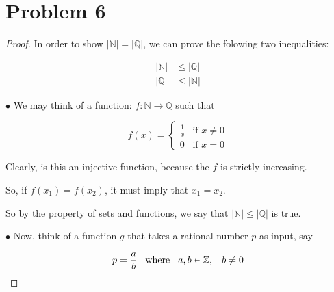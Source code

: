 \documentclass[12pt]{article}
\begin{document}
\newpage
\section*{Problem 6}

\begin{proof}
    In order to show $ \vert \mathbb{N} \vert = \vert \mathbb{Q} \vert $, we can prove the folowing
    two inequalities:

    \begin{align}
        \vert \mathbb{N} \vert & \leq \vert \mathbb{Q} \vert \\
        \vert \mathbb{Q} \vert & \leq \vert \mathbb{N} \vert 
    \end{align}

    \vspace*{0.3cm}
    \hspace*{1cm}
    $\bullet$ We may think of a function: $ f: \mathbb{N} \longrightarrow \mathbb{Q}$ such that
    

    \begin{equation*}
        f(x)=
            \begin{cases}
                \frac{1}{x} & \text{if } x \neq 0\\
                0 & \text{if } x = 0
            \end{cases}
        \end{equation*}

    \vspace*{0.3cm}
    \hspace*{1cm}
    Clearly, is this an injective function, because the $f$ is strictly increasing.
    
    \vspace*{0.3cm}
    \hspace*{1cm}
    So, if $f(x_1)=f(x_2)$, it must imply that $x_1 = x_2$.

    \vspace*{0.3cm}
    \hspace*{1cm}
    So by the property of sets and functions, we say that 
    $ \vert \mathbb{N} \vert \leq \vert \mathbb{Q} \vert$ is true.

    \vspace*{0.3cm}
    \hspace*{1cm}
    $\bullet$ Now, think of a function $g$ that takes a rational number $p$ as input, say

    \[ p = \frac{a}{b} \hspace*{0.3cm} \text{where} \hspace*{0.3cm} a,b \in \mathbb{Z}, \hspace*{0.3cm} b \neq 0 \]


\end{proof}
\end{document}

